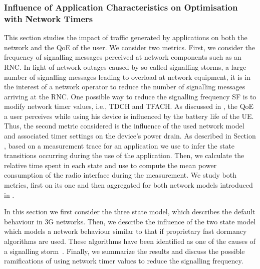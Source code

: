 \subsubsection*{Influence of Application Characteristics on Optimisation with Network Timers}\label{sec:network:network_traces:numerical_results:application_influence}
This section studies the impact of traffic generated by applications on both the network and the
\gls{QoE} of the user.
We consider two metrics.
First, we consider the frequency of signalling messages perceived at network components such as an \gls{RNC}.
In light of network outages caused by so called signalling storms, a large number of signalling messages leading to overload at network equipment, it is in the interest of a network operator to reduce the number of signalling messages arriving at the \gls{RNC}.
One possible way to reduce the signalling frequency \gls{SF} is to modify network timer values, i.e., \gls{TDCH} and \gls{TFACH}.
As discussed in , the \gls{QoE} a user perceives while using his device is influenced by the battery life of the \gls{UE}.
Thus, the second metric considered is the influence of the used network model and associated timer settings on the device’s power drain.
As described in Section , based on a measurement trace for an application we use  to infer the state transitions occurring during the use of the application.
Then, we calculate the relative time spent in each state and use  to compute the mean power
consumption of the radio interface during the measurement.
We study both metrics, first on its one and then aggregated for both network models introduced in .

In this section we first consider the three state model, which describes the default behaviour in \gls{3G} networks. 
Then, we describe the influence of the two state model which models a network behaviour similar to that if proprietary fast dormancy algorithms are used.
These algorithms have been identified as one of the causes of a signalling storm~\cite{NSN2011}.
Finally, we summarize the results and discuss the possible ramifications of using network timer values to reduce the signalling frequency.

